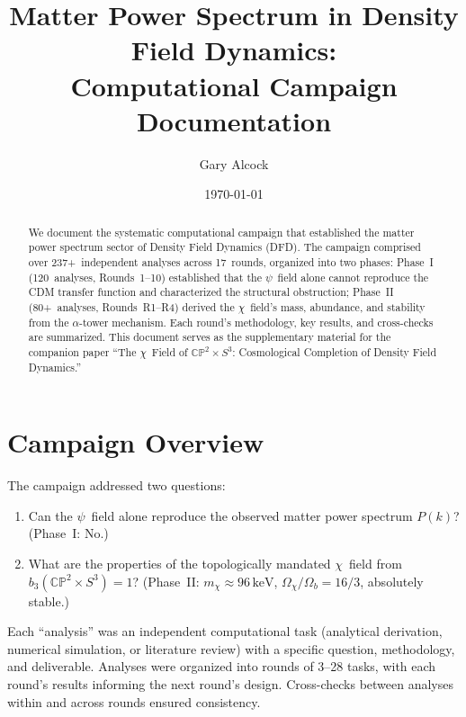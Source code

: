 \documentclass[aps,prd,twocolumn,superscriptaddress,nofootinbib]{revtex4-2}
\newcommand{\CP}{\mathbb{CP}}
\newcommand{\Sph}{S}
\newcommand{\keV}{\,\mathrm{keV}}
\begin{document}
\title{Matter Power Spectrum in Density Field Dynamics:\\
Computational Campaign Documentation}

\author{Gary Alcock}

\date{\today}

\begin{abstract}
We document the systematic computational campaign that
established the matter power spectrum sector of Density
Field Dynamics (DFD). The campaign comprised over
237+~independent analyses across 17~rounds, organized
into two phases: Phase~I (120~analyses, Rounds~1--10)
established that the $\psi$~field alone cannot reproduce
the CDM transfer function and characterized the structural
obstruction; Phase~II (80+~analyses, Rounds~R1--R4)
derived the $\chi$~field's mass, abundance, and stability
from the $\alpha$-tower mechanism. Each round's methodology,
key results, and cross-checks are summarized. This document
serves as the supplementary material for the companion
paper ``The $\chi$~Field of $\CP^2\times\Sph^3$:
Cosmological Completion of Density Field Dynamics.''
\end{abstract}

\maketitle

\section{Campaign Overview}

The campaign addressed two questions:
\begin{enumerate}
\item Can the $\psi$~field alone reproduce the observed
  matter power spectrum $P(k)$? (Phase~I: No.)
\item What are the properties of the topologically mandated
  $\chi$~field from $b_3(\CP^2\times\Sph^3)=1$?
  (Phase~II: $m_\chi\approx 96\keV$,
  $\Omega_\chi/\Omega_b = 16/3$, absolutely stable.)
\end{enumerate}

Each ``analysis'' was an independent computational task
(analytical derivation, numerical simulation, or
literature review) with a specific question, methodology,
and deliverable. Analyses were organized into rounds of
3--28 tasks, with each round's results informing the
next round's design. Cross-checks between analyses within
and across rounds ensured consistency.
\end{document}
